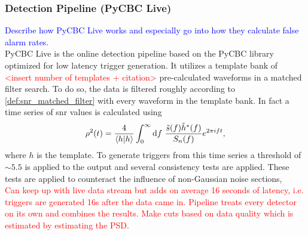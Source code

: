 \subsubsection{Detection Pipeline (PyCBC Live)}
\textcolor{blue}{Describe how PyCBC Live works and especially go into how they calculate false alarm rates.}\\
PyCBC Live is the online detection pipeline based on the PyCBC library optimized for low latency trigger generation. It utilizes a template bank of \textcolor{red}{<insert number of templates + citation>} pre-calculated waveforms in a matched filter search. To do so, the data is filtered roughly according to \eqref{def:snr_matched_filter} with every waveform in the template bank. In fact a time series of \gls{snr} values is calculated using
\begin{equation}
\rho^2(t) = \frac{4}{\langle h|h\rangle}\int_0^\infty\diff f\ \frac{\tilde{s}(f)\tilde{h}^\ast(f)}{S_n(f)}e^{2\pi i f t},
\end{equation}
where $h$ is the template. To generate triggers from this time series a threshold of $\sim 5.5$ is applied to the output and several consistency tests are applied. These tests are applied to counteract the influence of non-Gaussian noise sections, \\
\textcolor{red}{Can keep up with live data stream but adds on average 16 seconds of latency, i.e. triggers are generated 16s after the data came in. Pipeline treats every detector on its own and combines the results. Make cuts based on data quality which is estimated by estimating the PSD.}